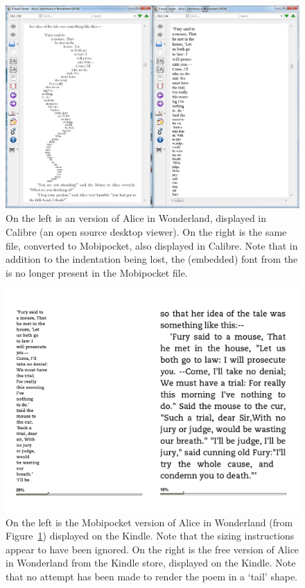 \begin{figure}
\includegraphics[width=\textwidth]{gfx/alices1}
\caption[Document displayed in Calibre]{On the left is an \epub{} version of Alice in Wonderland, displayed in Calibre (an open source desktop \ebook{} viewer). On the right is the same file, converted to Mobipocket, also displayed in Calibre. Note that in addition to the indentation being lost, the (embedded) font from the \epub{} is no longer present in the Mobipocket file.}
\label{fig:alices1}
\end{figure}

\begin{figure}
\includegraphics[width=\textwidth]{gfx/alices2}
\caption[The same document displayed on the Kindle]{On the left is the Mobipocket version of Alice in Wonderland (from Figure~\ref{fig:alices1}) displayed on the Kindle. Note that the sizing instructions appear to have been ignored. On the right is the free version of Alice in Wonderland from the Kindle store, displayed on the Kindle. Note that no attempt has been made to render the poem in a `tail' shape.}
\label{fig:alices2}
\end{figure}

